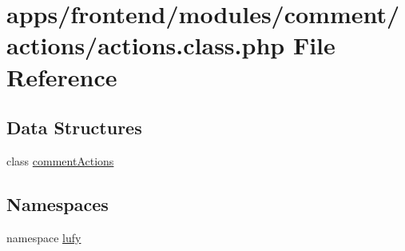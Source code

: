 \hypertarget{frontend_2modules_2comment_2actions_2actions_8class_8php}{\section{apps/frontend/modules/comment/actions/actions.class.\-php File Reference}
\label{frontend_2modules_2comment_2actions_2actions_8class_8php}
}
\subsection*{Data Structures}
\begin{DoxyCompactItemize}
\item 
class \hyperlink{classcomment_actions}{comment\-Actions}
\end{DoxyCompactItemize}
\subsection*{Namespaces}
\begin{DoxyCompactItemize}
\item 
namespace \hyperlink{namespacelufy}{lufy}
\end{DoxyCompactItemize}
